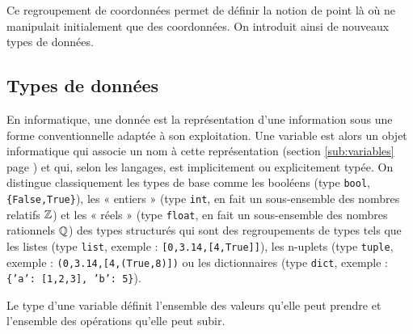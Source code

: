Ce regroupement de coordonnées permet de définir la notion de point là où
ne manipulait initialement que des coordonnées. On introduit ainsi de nouveaux 
types de données.

\subsection{Types de données}
En informatique, une donnée est la représentation d'une information sous une forme
conventionnelle adaptée à son exploitation. Une variable est alors un objet informatique 
qui associe un nom à cette représentation (section \ref{sub:variables} page \pageref{sub:variables})
et qui, selon les langages, est implicitement ou explicitement typée.
On distingue classiquement les types de base comme les booléens (type {\tt bool}, {\tt \{False,True\}}),
les « entiers » (type {\tt int}, en fait un sous-ensemble des nombres relatifs $\Bbb Z$) et les « réels »
(type {\tt float}, en fait un sous-ensemble des nombres rationnels $\Bbb Q$) des
types structurés qui sont des regroupements de types tels que les listes (type {\tt list}, 
exemple : {\tt [0,3.14,[4,True]]}), les n-uplets (type {\tt tuple}, exemple : {\tt (0,3.14,[4,(True,8)])}
ou les dictionnaires (type {\tt dict}, exemple : {\tt \{'a': [1,2,3], 'b': 5\}}).

\begin{defin}
Le type d'une variable définit l'ensemble des valeurs qu'elle peut prendre 
et l'ensemble des opérations qu'elle peut subir.
\end{defin}

